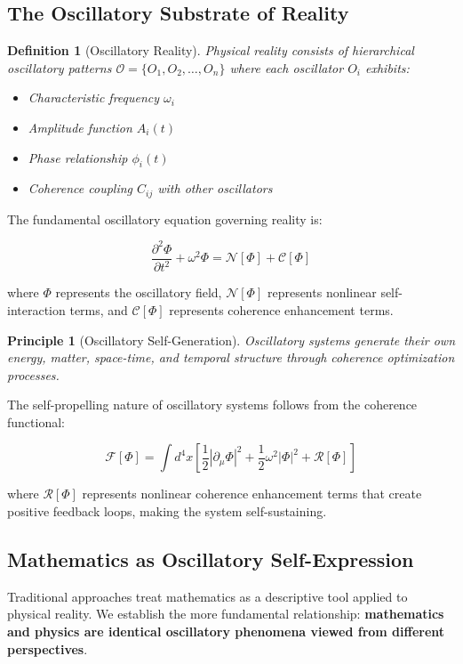 \documentclass[11pt,a4paper]{article}
\newtheorem{definition}[theorem]{Definition}
\newtheorem{principle}[theorem]{Principle}
\theoremstyle{remark}
\begin{document}
\subsection{The Oscillatory Substrate of Reality}

\begin{definition}[Oscillatory Reality]
Physical reality consists of hierarchical oscillatory patterns $\mathcal{O} = \{O_1, O_2, \ldots, O_n\}$ where each oscillator $O_i$ exhibits:
\begin{itemize}
\item Characteristic frequency $\omega_i$
\item Amplitude function $A_i(t)$
\item Phase relationship $\phi_i(t)$
\item Coherence coupling $C_{ij}$ with other oscillators
\end{itemize}
\end{definition}

The fundamental oscillatory equation governing reality is:

$$\frac{\partial^2 \Phi}{\partial t^2} + \omega^2 \Phi = \mathcal{N}[\Phi] + \mathcal{C}[\Phi]$$

where $\Phi$ represents the oscillatory field, $\mathcal{N}[\Phi]$ represents nonlinear self-interaction terms, and $\mathcal{C}[\Phi]$ represents coherence enhancement terms.

\begin{principle}[Oscillatory Self-Generation]
Oscillatory systems generate their own energy, matter, space-time, and temporal structure through coherence optimization processes.
\end{principle}

The self-propelling nature of oscillatory systems follows from the coherence functional:

$$\mathcal{F}[\Phi] = \int d^4x \left[\frac{1}{2}|\partial_\mu \Phi|^2 + \frac{1}{2}\omega^2|\Phi|^2 + \mathcal{R}[\Phi]\right]$$

where $\mathcal{R}[\Phi]$ represents nonlinear coherence enhancement terms that create positive feedback loops, making the system self-sustaining.

\subsection{Mathematics as Oscillatory Self-Expression}

Traditional approaches treat mathematics as a descriptive tool applied to physical reality. We establish the more fundamental relationship: \textbf{mathematics and physics are identical oscillatory phenomena viewed from different perspectives}.
\end{document}
